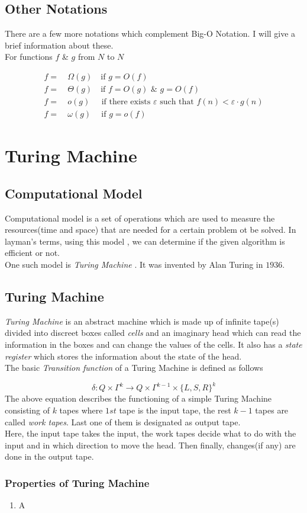 \documentclass[12pt,a4paper]{extarticle}
\begin{document}
\subsection{Other Notations}
There are a few more notations which complement Big-O Notation. I will give a brief information about these.\\
For functions $f$ \& $g$ from $N$ to $N$

\begin{align}
f =&\:\Omega(g)\quad  \textrm{if} \,\,  g=O(f)\\
f =&\:\Theta(g)\quad \textrm{if} \,\,  f=O(g) \,\, \& \,\, g=O(f)\\
f =&\:o(g)\:\,\quad \textrm{if there exists }\varepsilon \textrm{ such that} \,\, f(n)<\varepsilon\cdot g(n) \\
f =&\:\omega(g)\quad \:\textrm{if} \,\,  g=o(f)
\end{align}

\section{Turing Machine}
\subsection{Computational Model}
Computational model is a set of operations which are used to measure the resources(time and space) that are needed for a certain problem ot be solved. In layman's terms, using this model , we can determine if the given algorithm is efficient or not. \\ 
One such model is \textit{Turing Machine} . It was invented by Alan Turing in $1936$. 
\subsection{Turing Machine}
\textit{Turing Machine} is an abstract machine which is made up of infinite tape(s) divided into discreet boxes called \textit{cells} and an imaginary head which can read the information in the boxes and can change the values of the cells. It also has a \textit{state register} which stores the information about the state of the head.\\
The basic \textit{Transition function} of a Turing Machine is defined as follows

\begin{equation}
\delta:Q\times\Gamma^k\longrightarrow Q\times\Gamma^{k-1}\times\{L,S,R\}^k
\end{equation}  
The above equation describes the functioning of a simple Turing Machine consisting of $k$ tapes where $1st$ tape is the input tape, the rest $k-1$ tapes are called \textit{work tapes}. Last one of them is designated as output tape.\\
Here, the input tape takes the input, the work tapes decide what to do with the input and in which direction to move the head. Then finally, changes(if any) are done in the output tape.\par
 
\subsubsection{Properties of Turing Machine} 
\begin{enumerate}
 \item A
\end{enumerate}
\end{document}
